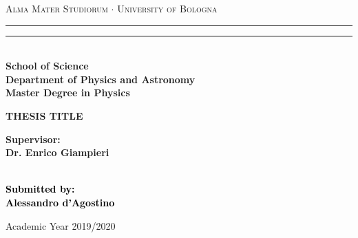 \begin{titlepage}
\begin{center}
{{\Large{\textsc{Alma Mater Studiorum $\cdot$ University of  Bologna}}}}
\rule[0.1cm]{15.8cm}{0.1mm}
\rule[0.5cm]{15.8cm}{0.6mm}
\\\vspace{3mm}
{\small{\bf School of Science \\
Department of Physics and Astronomy\\
Master Degree in Physics}}
\end{center}

\vspace{23mm}

\begin{center}
    \LARGE{\bf THESIS TITLE}\\
\end{center}

\vspace{50mm} \par \noindent

\begin{minipage}[t]{0.47\textwidth}
{\large{\bf Supervisor: \vspace{2mm}\\
Dr. Enrico Giampieri}\\\\}
\end{minipage}
%
\hfill
%
\begin{minipage}[t]{0.47\textwidth}\raggedleft
    \textcolor{black}{
        {\large{\bf Submitted by:
            \vspace{2mm}\\
            {Alessandro d'Agostino}}}
    }
\end{minipage}

\vspace{40mm}

\begin{center}
Academic Year 2019/2020
\end{center}
\end{titlepage}
